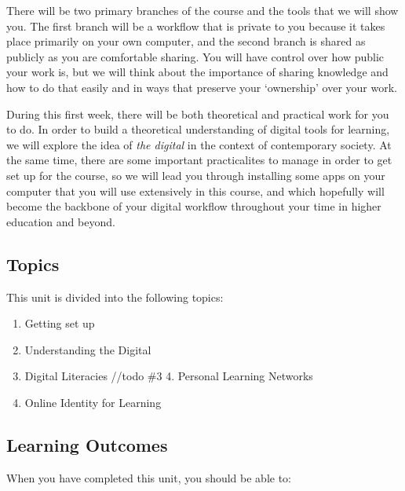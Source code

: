 \documentclass[
]{book}
\providecommand{\tightlist}{%
  \setlength{\itemsep}{0pt}\setlength{\parskip}{0pt}}
\theoremstyle{definition}
\theoremstyle{definition}
\theoremstyle{definition}
\theoremstyle{definition}
\theoremstyle{remark}
\begin{document}
There will be two primary branches of the course and the tools that we will show you. The first branch will be a workflow that is private to you because it takes place primarily on your own computer, and the second branch is shared as publicly as you are comfortable sharing. You will have control over how public your work is, but we will think about the importance of sharing knowledge and how to do that easily and in ways that preserve your `ownership' over your work.

During this first week, there will be both theoretical and practical work for you to do. In order to build a theoretical understanding of digital tools for learning, we will explore the idea of \emph{the digital} in the context of contemporary society. At the same time, there are some important practicalites to manage in order to get set up for the course, so we will lead you through installing some apps on your computer that you will use extensively in this course, and which hopefully will become the backbone of your digital workflow throughout your time in higher education and beyond.

\hypertarget{topics}{%
\subsection*{Topics}\label{topics}}

This unit is divided into the following topics:

\begin{enumerate}
\def\labelenumi{\arabic{enumi}.}
\tightlist
\item
  Getting set up
\item
  Understanding the Digital
\item
  Digital Literacies
  //todo \#3 4. Personal Learning Networks
\item
  Online Identity for Learning
\end{enumerate}

\hypertarget{learning-outcomes}{%
\subsection*{Learning Outcomes}\label{learning-outcomes}}

When you have completed this unit, you should be able to:
\end{document}
